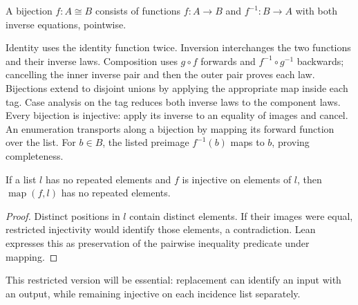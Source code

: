 \begin{definition}[Bijection]\label{term:bijection}
A bijection $f:A\cong B$ consists of functions $f:A\to B$ and $f^{-1}:B\to A$
with both inverse equations, pointwise.
\end{definition}
Identity uses the identity function twice. Inversion interchanges the two functions
and their inverse laws. Composition uses $g\circ f$ forwards and
$f^{-1}\circ g^{-1}$ backwards; cancelling the inner inverse pair and then the
outer pair proves each law.
Bijections extend to disjoint unions by applying the appropriate map inside each
tag. Case analysis on the tag reduces both inverse laws to the component laws.
Every bijection is injective: apply its inverse to an equality of images and
cancel. An enumeration transports along a bijection by mapping its forward
function over the list. For $b\in B$, the listed preimage $f^{-1}(b)$ maps to $b$,
proving completeness.
\begin{lemma}
If a list $l$ has no repeated elements and $f$ is injective on elements of $l$,
then $\operatorname{map}(f,l)$ has no repeated elements.
\end{lemma}
\begin{proof}
Distinct positions in $l$ contain distinct elements. If their images were equal,
restricted injectivity would identify those elements, a contradiction. Lean
expresses this as preservation of the pairwise inequality predicate under mapping.
\end{proof}
This restricted version will be essential: replacement can identify an input
with an output, while remaining injective on each incidence list separately.


